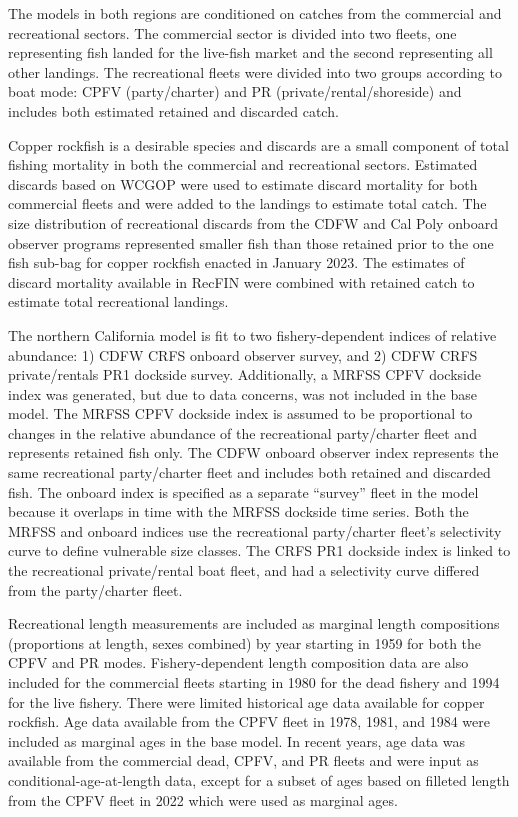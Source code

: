 \documentclass[11pt,
  english,
  letterpaper,
]{article}
\begin{document}
The models in both regions are conditioned on catches from the commercial and recreational sectors. The commercial sector is divided into two fleets, one representing fish landed for the live-fish market and the second representing all other landings. The recreational fleets were divided into two groups according to boat mode: CPFV (party/charter) and PR (private/rental/shoreside) and includes both estimated retained and discarded catch.

Copper rockfish is a desirable species and discards are a small component of total fishing mortality in both the commercial and recreational sectors. Estimated discards based on WCGOP were used to estimate discard mortality for both commercial fleets and were added to the landings to estimate total catch. The size distribution of recreational discards from the CDFW and Cal Poly onboard observer programs represented smaller fish than those retained prior to the one fish sub-bag for copper rockfish enacted in January 2023. The estimates of discard mortality available in RecFIN were combined with retained catch to estimate total recreational landings.

The northern California model is fit to two fishery-dependent indices of relative abundance: 1) CDFW CRFS onboard observer survey, and 2) CDFW CRFS private/rentals PR1 dockside survey. Additionally, a MRFSS CPFV dockside index was generated, but due to data concerns, was not included in the base model. The MRFSS CPFV dockside index is assumed to be proportional to changes in the relative abundance of the recreational party/charter fleet and represents retained fish only. The CDFW onboard observer index represents the same recreational party/charter fleet and includes both retained and discarded fish. The onboard index is specified as a separate ``survey'' fleet in the model because it overlaps in time with the MRFSS dockside time series. Both the MRFSS and onboard indices use the recreational party/charter fleet's selectivity curve to define vulnerable size classes. The CRFS PR1 dockside index is linked to the recreational private/rental boat fleet, and had a selectivity curve differed from the party/charter fleet.

Recreational length measurements are included as marginal length compositions (proportions at length, sexes combined) by year starting in 1959 for both the CPFV and PR modes. Fishery-dependent length composition data are also included for the commercial fleets starting in 1980 for the dead fishery and 1994 for the live fishery. There were limited historical age data available for copper rockfish. Age data available from the CPFV fleet in 1978, 1981, and 1984 were included as marginal ages in the base model. In recent years, age data was available from the commercial dead, CPFV, and PR fleets and were input as conditional-age-at-length data, except for a subset of ages based on filleted length from the CPFV fleet in 2022 which were used as marginal ages.
\end{document}
